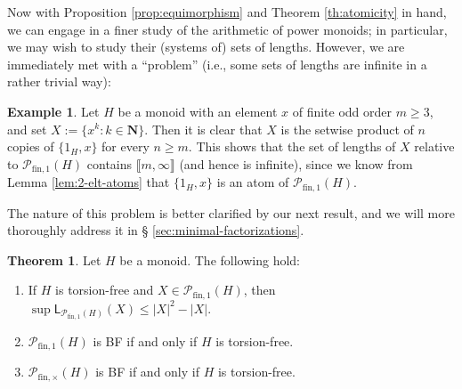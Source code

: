 \documentclass{report}
\renewcommand{\P}{\mathcal{P}}
\newcommand{\llb}{\llbracket}
\newcommand{\rrb}{\rrbracket}
\newcommand{\funt}{{\textrm{fin}, \times}}
\newcommand{\fun}{{\textrm{fin}, 1}}
\renewcommand{\:}{\text{:}}
\theoremstyle{definition}
\newtheorem{thm}[defn]{Theorem}
\newtheorem{eg}[defn]{Example}
\begin{document}
Now with Proposition \ref{prop:equimorphism} and Theorem \ref{th:atomicity} in hand, we can engage in a finer study of the arithmetic of power monoids; in particular, we may wish to study their (systems of) sets of lengths. However, we are immediately met with a ``problem'' (i.e., some sets of lengths are infinite in a rather trivial way):
%
\begin{eg}\label{unbounded-fzn}
	Let $H$ be a monoid with an element $x$ of finite odd order $m \ge 3$, and set $X := \{x^k : k \in \mathbf N \}$. Then it is clear that $X$ is the setwise product of $n$ copies of $\{1_H, x\}$ for every $n \ge m$. This shows that the set of lengths of $X$ relative to $\P_\fun(H)$ contains $\llb m, \infty \rrb$ (and hence is infinite), since we know from Lemma \ref{lem:2-elt-atoms} that $\{1_H, x\}$ is an atom of $\P_\fun(H)$.
\end{eg}
%
The nature of this problem is better clarified by our next result, and we will more thoroughly address it in \S{ }\ref{sec:minimal-factorizations}.
%
\begin{thm}\label{thm:BF-torsion}
	Let $H$ be a monoid. The following hold:
	\begin{enumerate}[label={\rm (\roman{*})}]
		\item\label{it:thm:BF-torsion(i)} If $H$ is torsion-free and $X\in \P_\fun(H)$, then $\sup \mathsf{L}_{\mathcal P_\fun(H)}(X) \le |X|^2-|X|$.
		\item\label{it:thm:BF-torsion(ii)} $\P_\fun(H)$ is \textup{BF} if and only if $H$ is torsion-free.
		\item\label{it:thm:BF-torsion(iii)} $\P_\funt(H)$ is \textup{BF} if and only if $H$ is torsion-free.
	\end{enumerate}
\end{thm}
\end{document}
